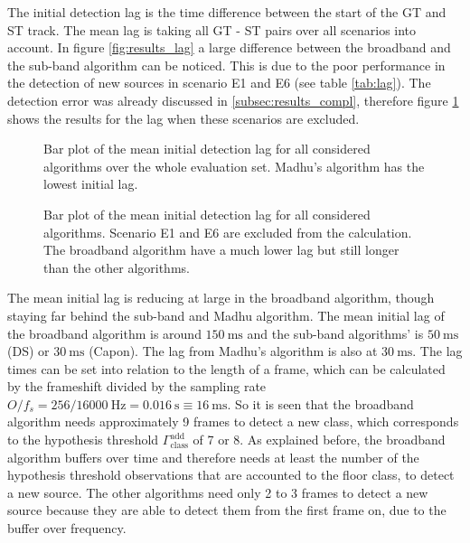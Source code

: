 The initial detection lag is the time difference between the start of the \ac{GT} and \ac{ST} track. The mean lag is taking all GT - \ac{ST} pairs over all scenarios into account. In figure \ref{fig:results_lag} a large difference between the broadband and the sub-band algorithm can be noticed. This is due to the poor performance in the detection of new sources in scenario E1 and E6 (see table \ref{tab:lag}). The detection error was already discussed in \ref{subsec:results_compl}, therefore figure \ref{fig:results_lag2} shows the results for the lag when these scenarios are excluded.
\begin{figure}[!ht]
	\centering
	\begin{minipage}[t]{.49\textwidth}
		\def\svgwidth{1\linewidth}
		  \small
		\caption{Bar plot of the mean initial detection lag for all considered algorithms over the whole evaluation set. Madhu's algorithm has the lowest initial lag.}
		\label{fig:results_lag}
	\end{minipage}%
	\hfill
	\begin{minipage}[t]{.49\textwidth}
		\centering
		\def\svgwidth{1\linewidth}
		\small
		\caption{Bar plot of the mean initial detection lag for all considered algorithms. Scenario E1 and E6 are excluded from the calculation. The broadband algorithm have a much lower lag but still longer than the other algorithms.}
		\label{fig:results_lag2}
	\end{minipage}
\end{figure}
The mean initial lag is reducing at large in the broadband algorithm, though staying far behind the sub-band and Madhu algorithm. The mean initial lag of the broadband algorithm is around $\SI{150}{\ms}$ and the sub-band algorithms' is $\SI{50}{\ms}$ (\ac{DS}) or $\SI{30}{\ms}$ (Capon). The lag from Madhu's algorithm is also at $\SI{30}{\ms}$. The lag times can be set into relation to the length of a frame, which can be calculated by the frameshift divided by the sampling rate $O/f_s=256/\SI{16000}{\Hz}=\SI{0.016}{\s}\equiv\SI{16}{\ms}$. So it is  seen that the broadband algorithm needs approximately 9 frames to detect a new class, which corresponds to the hypothesis threshold $\Gamma_\text{class}^\text{add}$ of 7 or 8. As explained before, the broadband algorithm buffers over time and therefore needs at least the number of the hypothesis threshold observations that are accounted to the floor class, to detect a new source. The other algorithms need only 2 to 3 frames to detect a new source because they are able to detect them from the first frame on, due to the buffer over frequency.

